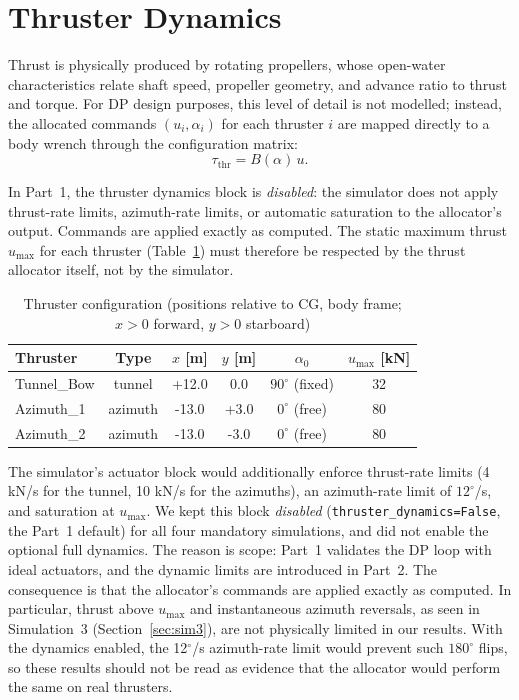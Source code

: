 \documentclass[10pt,conference]{IEEEtran}
\begin{document}
\section{Thruster Dynamics}
\label{sec:thrusters}

Thrust is physically produced by rotating propellers, whose
open-water characteristics relate shaft speed, propeller geometry, and
advance ratio to thrust and torque. For DP design purposes, this level
of detail is not modelled; instead, the allocated commands
$(u_i, \alpha_i)$ for each thruster $i$ are mapped directly to a body
wrench through the configuration matrix:
\begin{equation}
\tau_{\mathrm{thr}} = B(\alpha)\, u.
\label{eq:thrustdyn}
\end{equation}

In Part~1, the thruster dynamics block is \emph{disabled}: the
simulator does not apply thrust-rate limits, azimuth-rate limits, or
automatic saturation to the allocator's output. Commands are applied
exactly as computed. The static maximum thrust $u_{\max}$ for each
thruster (Table~\ref{tab:thrusters}) must therefore be respected by
the thrust allocator itself, not by the simulator.

\begin{table}[htbp]
\centering
\caption{Thruster configuration (positions relative to CG, body
frame; $x>0$ forward, $y>0$ starboard)}
\label{tab:thrusters}
\begin{tabular}{@{}lccccc@{}}
\toprule
Thruster & Type & $x$ [m] & $y$ [m] & $\alpha_0$ & $u_{\max}$ [kN] \\
\midrule
Tunnel\_Bow & tunnel & +12.0 & 0.0 & $90^\circ$ (fixed) & 32 \\
Azimuth\_1 & azimuth & -13.0 & +3.0 & $0^\circ$ (free) & 80 \\
Azimuth\_2 & azimuth & -13.0 & -3.0 & $0^\circ$ (free) & 80 \\
\bottomrule
\end{tabular}
\end{table}

The simulator's actuator block would additionally enforce thrust-rate
limits (4 kN/s for the tunnel, 10 kN/s for the azimuths), an
azimuth-rate limit of $12^\circ$/s, and saturation at $u_{\max}$.
We kept this block \emph{disabled} (\texttt{thruster\_dynamics=False},
the Part~1 default) for all four mandatory simulations, and did not
enable the optional full dynamics. The reason is scope: Part~1
validates the DP loop with ideal actuators, and the dynamic limits
are introduced in Part~2. The consequence is that the allocator's
commands are applied exactly as computed. In particular, thrust above
$u_{\max}$ and instantaneous azimuth reversals, as seen in
Simulation~3 (Section~\ref{sec:sim3}), are not physically limited in
our results. With the dynamics enabled, the 12$^\circ$/s azimuth-rate
limit would prevent such $180^\circ$ flips, so these results should
not be read as evidence that the allocator would perform the same on
real thrusters.
\end{document}
